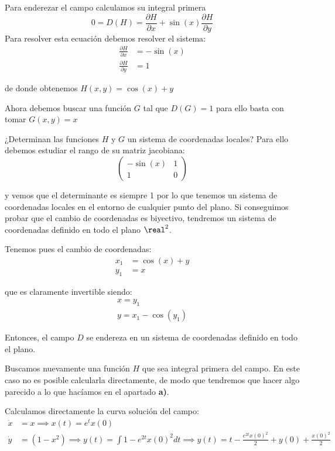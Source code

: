 \begin{problem}[5]
\spart

Para enderezar el campo calculamos su integral primera
\[0 = D(H) = \frac{\partial H}{\partial x}+\sin(x)\frac{\partial H}{\partial y}\]
Para resolver esta ecuación debemos resolver el sistema:
\begin{align*}
\frac{\partial H}{\partial x} &= -\sin(x)\\
\frac{\partial H}{\partial y} &= 1
\end{align*}

de donde obtenemos $H(x,y)=\cos(x)+y$

Ahora debemos buscar una función $G$ tal que $D(G)=1$ para ello basta con tomar $G(x,y)=x$

¿Determinan las funciones $H$ y $G$ un sistema de coordenadas locales? Para ello debemos estudiar el rango de su matriz jacobiana:
\[\left( \begin{array}{cc}
-\sin(x) & 1  \\
1 & 0  \end{array} \right)\]

y vemos que el determinante es siempre 1 por lo que tenemos un sistema de coordenadas locales en el entorno de cualquier punto del plano. Si conseguimos probar que el cambio de coordenadas es biyectivo, tendremos un sistema de coordenadas definido en todo el plano $\real^2$.

Tenemos pues el cambio de coordenadas:
\begin{align*}
x_1 &= \cos(x)+y\\
y_1 &= x
\end{align*}

que es claramente invertible siendo:
\begin{align*}
x = y_1\\
y = x_1 - \cos(y_1)
\end{align*}

Entonces, el campo $D$ se endereza en un sistema de coordenadas definido en todo el plano.

\spart
\yoP

Buscamos nuevamente una función $H$ que sea integral primera del campo. En este caso no es posible calcularla directamente, de modo que tendremos que hacer algo parecido a lo que hacíamos en el apartado \textbf{a)}.

Calculamos directamente la curva solución del campo:
\begin{align*}
\dot{x}&=x \implies x(t)=e^tx(0)\\
\dot{y}&=(1-x^2) \implies y(t)=\int 1-e^{2t}x(0)^2 dt \implies y(t)=t-\frac{e^{2t}x(0)^2}{2}+y(0)+\frac{x(0)^2}{2}
\end{align*}


\end{problem}
